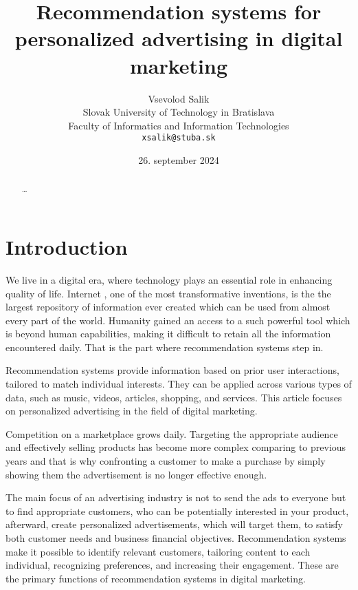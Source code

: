 \documentclass[10pt,twoside,english,a4paper]{article}
\title{Recommendation systems for personalized advertising in digital marketing} %
\author{Vsevolod Salik\\[2pt]
	{\small Slovak University of Technology in Bratislava }\\
	{\small Faculty of Informatics and Information Technologies }\\
	{\small \texttt{xsalik@stuba.sk}}
	}
\date{\small 26. september 2024} %
\begin{document}
\maketitle



\begin{abstract}
\ldots
\end{abstract}



\section{Introduction}
\medskip We live in a digital era, where technology plays an essential role in enhancing quality of life. Internet , one of the most transformative inventions, is the the largest repository of information ever created which can be used from almost every part of the world. Humanity gained an access to a such powerful tool which is beyond human capabilities, making it difficult to retain all the information encountered daily. That is the part where recommendation systems step in.

\medskip Recommendation systems provide information based on prior user interactions, tailored to match individual interests. They can be applied across various types of data, such as music, videos, articles, shopping, and services. This article focuses on personalized advertising in the field of digital marketing.

\medskip Competition on a marketplace grows daily. Targeting the appropriate audience and effectively selling products has become more complex comparing to previous years and that is why confronting a customer to make a purchase by simply showing them the advertisement is no longer effective enough. 

\medskip The main focus of an advertising industry is not to send the ads to everyone but to find appropriate customers, who can be potentially interested in your product, afterward, create personalized advertisements, which will target them, to satisfy both customer needs and business financial objectives. Recommendation systems make it possible to identify relevant customers, tailoring content to each individual, recognizing preferences, and increasing their engagement. These are the primary functions of recommendation systems in digital marketing.
\end{document}
